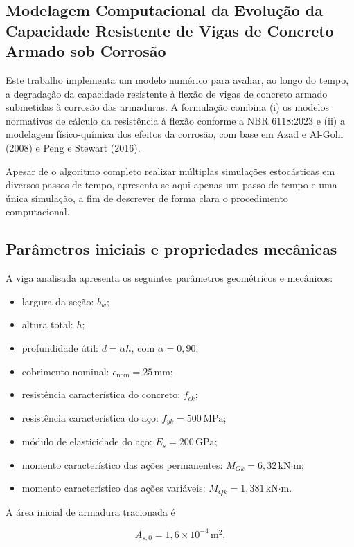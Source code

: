 \subsection{Modelagem Computacional da Evolução da Capacidade Resistente de Vigas de Concreto Armado sob Corrosão}

Este trabalho implementa um modelo numérico para avaliar, ao longo do tempo, a degradação da capacidade resistente à flexão de vigas de concreto armado submetidas à corrosão das armaduras. A formulação combina (i) os modelos normativos de cálculo da resistência à flexão conforme a NBR 6118:2023 e (ii) a modelagem físico-química dos efeitos da corrosão, com base em Azad e Al-Gohi (2008) e Peng e Stewart (2016). 

Apesar de o algoritmo completo realizar múltiplas simulações estocásticas em diversos passos de tempo, apresenta-se aqui apenas um passo de tempo e uma única simulação, a fim de descrever de forma clara o procedimento computacional.

\subsection{Parâmetros iniciais e propriedades mecânicas}

A viga analisada apresenta os seguintes parâmetros geométricos e mecânicos:

\begin{itemize}
    \item largura da seção: $b_w$;
    \item altura total: $h$;
    \item profundidade útil: $d = \alpha h$, com $\alpha = 0{,}90$;
    \item cobrimento nominal: $c_{\mathrm{nom}} = 25\,\text{mm}$;
    \item resistência característica do concreto: $f_{ck}$;
    \item resistência característica do aço: $f_{yk} = 500\,\text{MPa}$;
    \item módulo de elasticidade do aço: $E_s = 200\,\text{GPa}$;
    \item momento característico das ações permanentes: $M_{Gk} = 6{,}32\,\text{kN·m}$;
    \item momento característico das ações variáveis: $M_{Qk} = 1{,}381\,\text{kN·m}$.
\end{itemize}

A área inicial de armadura tracionada é

\[
A_{s,0} = 1{,}6 \times 10^{-4}\,\text{m}^2.
\]

